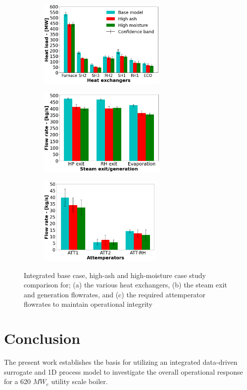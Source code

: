 \documentclass[a4paper,fleqn]{cas-sc}
\begin{document}
\begin{figure}
\centering
\begin{subfigure}{0.33\textwidth}
    \includegraphics[width=\textwidth, height = 4.25cm]{100_FUEL_CASE}
    \caption{}
\end{subfigure}\hfill %
\begin{subfigure}{0.33\textwidth}
    \includegraphics[width=\linewidth, height = 4.25cm]{100_FUEL_CASE_STEAM}
    \caption{}
\end{subfigure}\hfill
\begin{subfigure}{0.33\textwidth}
    \includegraphics[width=\linewidth, height = 4.25cm]{100_FUEL_CASE_ATTEMP}
    \caption{}
\end{subfigure}
\caption{Integrated base case, high-ash and high-moisture case study comparison for; (a) the various heat exchangers, (b) the steam exit and generation flowrates, and (c) the required attemperator flowrates to maintain operational integrity}
\label{fig_fuel_results}
\end{figure}
\newpage
\section{Conclusion}
The present work establishes the basis for utilizing an integrated data-driven surrogate and 1D process model to investigate the overall operational response for a 620 $MW_e$ utility scale boiler.\\
\end{document}
